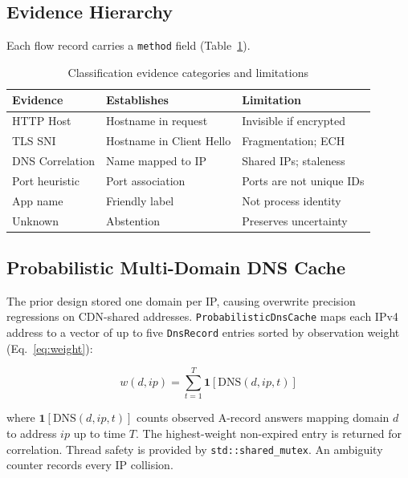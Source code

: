 \documentclass[conference]{IEEEtran}
\begin{document}
\subsection{Evidence Hierarchy}

Each flow record carries a \texttt{method} field (Table~\ref{tab:evidence}).

\begin{table}[!t]
\centering
\caption{Classification evidence categories and limitations}
\label{tab:evidence}
\scriptsize
\begin{tabular}{|p{1.3cm}|p{2.0cm}|p{2.5cm}|}
\hline
\textbf{Evidence} & \textbf{Establishes} & \textbf{Limitation} \\
\hline
HTTP Host & Hostname in request & Invisible if encrypted \\
\hline
TLS SNI & Hostname in Client Hello & Fragmentation; ECH \\
\hline
DNS Correlation & Name mapped to IP & Shared IPs; staleness \\
\hline
Port heuristic & Port association & Ports are not unique IDs \\
\hline
App name & Friendly label & Not process identity \\
\hline
Unknown & Abstention & Preserves uncertainty \\
\hline
\end{tabular}
\end{table}

\subsection{Probabilistic Multi-Domain DNS Cache}

The prior design stored one domain per IP, causing overwrite
precision regressions on CDN-shared addresses.
\texttt{ProbabilisticDnsCache} maps each IPv4 address to a vector of
up to five \texttt{DnsRecord} entries sorted by observation weight
(Eq.~\ref{eq:weight}):

\begin{equation}
w(d, ip) = \sum_{t=1}^{T} \mathbf{1}[\text{DNS}(d, ip, t)]
\label{eq:weight}
\end{equation}

where $\mathbf{1}[\text{DNS}(d,ip,t)]$ counts observed A-record
answers mapping domain $d$ to address $ip$ up to time $T$.
The highest-weight non-expired entry is returned for correlation.
Thread safety is provided by \texttt{std::shared\_mutex}.
An ambiguity counter records every IP collision.
\end{document}
